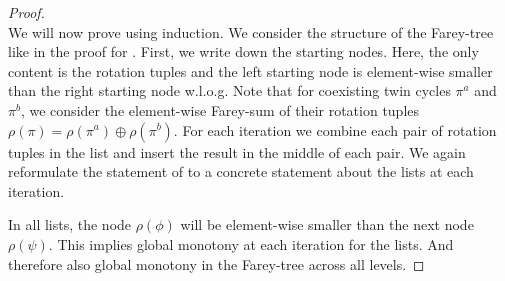 \begin{proof} \phantom{x} \\
	We will now prove  using induction.
	We consider the structure of the Farey-tree like in the proof for .
	First, we write down the starting nodes.
	Here, the only content is the rotation tuples and the left starting node is element-wise smaller than the right starting node w.l.o.g.
	Note that for coexisting twin cycles $\pi^a$ and $\pi^b$, we consider the element-wise Farey-sum of their rotation tuples $\rho(\pi) = \rho(\pi^a) \oplus \rho(\pi^b)$.
	For each iteration we combine each pair of rotation tuples in the list and insert the result in the middle of each pair.
	We again reformulate the statement of  to a concrete statement about the lists at each iteration.

	In all lists, the node $\rho(\phi)$ will be element-wise smaller than the next node $\rho(\psi)$.
	This implies global monotony at each iteration for the lists.
	And therefore also global monotony in the Farey-tree across all levels.


\end{proof}
